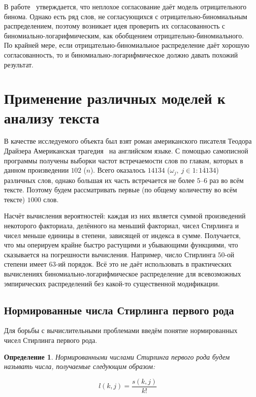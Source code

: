 \documentclass[12pt, specialist, subf, substylefile = spbu_report.rtx]{disser}
\newtheorem{define}{Определение}
\begin{document}
	В работе~\cite{bib:alexeeva2013} утверждается, что неплохое согласование даёт модель отрицательного бинома. Однако есть ряд слов, не согласующихся с отрицательно-биномиальным распределением, поэтому возникает идея проверить их согласованность с биномиально-логарифмическим, как обобщением отрицательно-биномиального. По крайней мере, если отрицательно-биномиальное распределение даёт хорошую согласованность, то и биномиально-логарифмическое должно давать похожий результат.
	
	\section{Применение различных моделей к анализу текста}
	
	В качестве исследуемого объекта был взят роман американского писателя Теодора Драйзера \glqq Американская трагедия\grqq~ на английском языке. С помощью самописной программы получены выборки частот встречаемости слов по главам, которых в данном произведении $ 102 $ ($ n $). Всего оказалось $ 14134 $ ($ \omega_j,~ j \in \overline{1:14134} $) различных слов, однако большая их часть встречается не более $ 5 $--$ 6 $ раз во всём тексте. Поэтому будем рассматривать первые (по общему количеству во всём тексте) $ 1000 $ слов.
	
	Насчёт вычисления вероятностей: каждая из них является суммой произведений некоторого факториала, делённого на меньший факториал, чисел Стирлинга и чисел меньше единицы в степени, зависящей от индекса в сумме. Получается, что мы оперируем крайне быстро растущими и убывающими функциями, что сказывается на погрешности вычисления. Например, число Стирлинга $ 50 $-ой степени имеет $ 63 $-ий порядок. Всё это не даёт использовать в практических вычислениях биномиально-логарифмическое распределение для всевозможных эмпирических распределений без какой-то существенной модификации.
	
	\subsection{Нормированные числа Стирлинга первого рода}
	
	Для борьбы с вычислительными проблемами введём понятие нормированных чисел Стирлинга первого рода.
	
	\begin{define}
		Нормированными числами Стирлинга первого рода будем называть числа, получаемые следующим образом:
		
		\[
			l(k, j) = \frac {s(k, j)} {k!}
		\]
		\label{def:3}
	\end{define}
	
\end{document}
